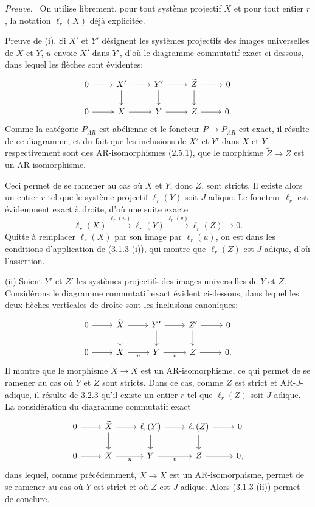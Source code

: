 \documentclass[11pt]{article}
\newenvironment{prooftext}[1][Proof]{\par\noindent\emph{#1.}\ }{\par\medskip}
\begin{document}
\begin{prooftext}[Preuve]
On utilise librement, pour tout système projectif $X$ et pour tout entier $r$, la notation $\ell_r(X)$ déjà explicitée.

Preuve de (i). Si $X'$ et $Y'$ désignent les systèmes projectifs des images universelles de $X$ et $Y$, $u$ envoie $X'$ dans $Y'$, d'où le diagramme commutatif exact ci-dessous, dans lequel les flèches sont évidentes:
\[
\begin{tikzcd}
0 \arrow[r] & X' \arrow[r] \arrow[d] & Y' \arrow[r] \arrow[d] & \widetilde Z \arrow[r] \arrow[d] & 0\\
0 \arrow[r] & X \arrow[r] & Y \arrow[r] & Z \arrow[r] & 0 .
\end{tikzcd}
\]
Comme la catégorie $P_{AR}$ est abélienne et le foncteur $P\to P_{AR}$ est exact, il résulte de ce diagramme, et du fait que les inclusions de $X'$ et $Y'$ dans $X$ et $Y$ respectivement sont des AR-isomorphismes (2.5.1), que le morphisme $\widetilde Z\to Z$ est un AR-isomorphisme.

Ceci permet de se ramener au cas où $X$ et $Y$, donc $Z$, sont stricts. Il existe alors un entier $r$ tel que le système projectif $\ell_r(Y)$ soit $J$-adique. Le foncteur $\ell_r$ est évidemment exact à droite, d'où une suite exacte
\[
\ell_r(X)\stackrel{\ell_r(u)}{\longrightarrow}\ell_r(Y)\stackrel{\ell_r(v)}{\longrightarrow}\ell_r(Z)\longrightarrow0.
\]
Quitte à remplacer $\ell_r(X)$ par son image par $\ell_r(u)$, on est dans les conditions d'application de (3.1.3 (i)), qui montre que $\ell_r(Z)$ est $J$-adique, d'où l'assertion.

(ii) Soient $Y'$ et $Z'$ les systèmes projectifs des images universelles de $Y$ et $Z$. Considérons le diagramme commutatif exact évident ci-dessous, dans lequel les deux flèches verticales de droite sont les inclusions canoniques:
\[
\begin{tikzcd}
0 \arrow[r] & \widetilde X \arrow[r] \arrow[d] & Y' \arrow[r] \arrow[d] & Z' \arrow[r] \arrow[d] & 0\\
0 \arrow[r] & X \arrow[r,"u"'] & Y \arrow[r,"v"'] & Z \arrow[r] & 0 .
\end{tikzcd}
\]
Il montre que le morphisme $\widetilde X\to X$ est un AR-isomorphisme, ce qui permet de se ramener au cas où $Y$ et $Z$ sont stricts. Dans ce cas, comme $Z$ est strict et AR-$J$-adique, il résulte de 3.2.3 qu'il existe un entier $r$ tel que $\ell_r(Z)$ soit $J$-adique. La considération du diagramme commutatif exact
\[
\begin{tikzcd}
0 \arrow[r] & \widetilde X \arrow[r] \arrow[d] & \ell_r(Y) \arrow[r] \arrow[d] & \ell_r(Z) \arrow[r] \arrow[d] & 0\\
0 \arrow[r] & X \arrow[r,"u"'] & Y \arrow[r,"v"'] & Z \arrow[r] & 0,
\end{tikzcd}
\]
dans lequel, comme précédemment, $\widetilde X\to X$ est un AR-isomorphisme, permet de se ramener au cas où $Y$ est strict et où $Z$ est $J$-adique. Alors (3.1.3 (ii)) permet de conclure.
\end{prooftext}
\end{document}
